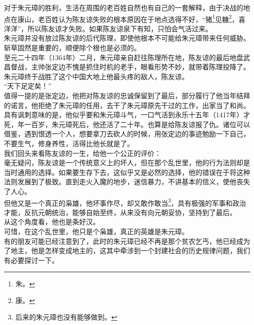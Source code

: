 \begin{multicols}{\theparacolNo}
对于朱元璋的胜利，生活在周围的老百姓自然也有自己的一套解释，由于决战的地点在康山，老百姓认为陈友谅失败的根本原因在于地点选得不好，“猪\footnote{朱。}见糠\footnote{康。}，喜洋洋”，所以陈友谅才失败。如果陈友谅泉下有知，只怕会气活过来。\\

朱元璋并没有放过陈友谅的后代陈理，即使他根本不可能给朱元璋带来任何威胁。斩草固然是重要的，顺便除个根也是必须的。\\

至元二十四年（1364年）二月，朱元璋亲自赶往陈理所在地，陈友谅的最后地盘武昌督战，主帅张定边不愧是抓住时机的老手，眼看形势不妙，就带着陈理投降了。\\

朱元璋终于战胜了这个中国大地上他最头疼的敌人，陈友谅。\\

“天下足定矣！”\\

值得一提的是张定边，他把对陈友谅的忠诚保留到了最后，部分履行了他当年结拜的诺言，他拒绝了朱元璋的任用，去干了朱元璋原先干过的工作，出家当了和尚。\\

具有讽刺意味的是，他似乎要和朱元璋斗气，一口气活到永乐十五年（1417年）才死，年一百岁，朱元璋死后，他还活了二十年。也算是给陈友谅报了仇。诸位可以借鉴，遇到恨透一个人，想要拿刀去砍人的时候，用张定边的事迹勉励一下自己，不要生气，修身养性，活得比他长就是了。\\

我们回头来看陈友谅的一生，给他一个公正的评价：\\

毫无疑问，陈友谅是一个传统意义上的坏人，但在那个乱世里，他的行为法则却是当时通用的选择。如果要生存下去，这似乎又是必然的选择，他的错误在于将这种法则发展到了极致。直到走火入魔的地步，迷信暴力，不讲基本的信义，使他丧失了人心。\\

但他又是一个真正的枭雄，他坏事作尽，却又敢作敢当\footnote{后来的朱元璋也没有能够做到。}，具有极强的军事和政治才能，反抗元朝统治，能够自始至终，从来没有向元朝妥协，坚持到了最后。\\

从这个角度看，他也是条好汉。\\

可惜，在这个乱世里，他只是个枭雄，真正的英雄是朱元璋。\\

有的朋友可能已经注意到了，此时的朱元璋已经不再是那个贫农乞丐，他已经成为了地主，他是怎样变成地主的，这其中牵涉到一个封建社会的历史规律问题，我们有必要探讨一下。\\


\end{multicols}
